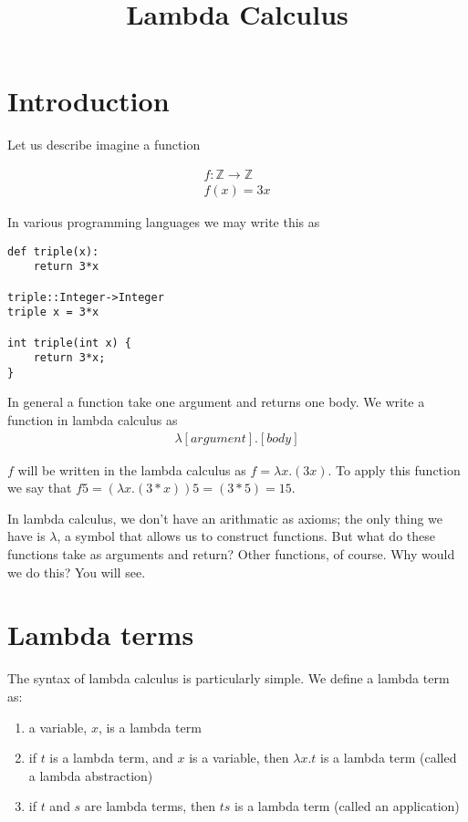 \documentclass{article}
\title{Lambda Calculus}
\date{}
\begin{document}
\maketitle

\section{Introduction}
Let us describe imagine a function 

\begin{align}
f:\mathbb{Z}\rightarrow\mathbb{Z}\\
f(x) = 3x
\end{align}

In various programming languages we may write this as

\begin{verbatim}
def triple(x):
    return 3*x
    
triple::Integer->Integer
triple x = 3*x

int triple(int x) {
    return 3*x;
}
\end{verbatim}

In general a function take one argument and returns one body. We write a function in lambda calculus as 
\begin{align}
\lambda[argument].[body]
\end{align}

$f$ will be written in the lambda calculus as $f = \lambda x.(3x)$. To apply this function we say that $f5 = (\lambda x.(3*x))5 = (3*5) = 15$.

In lambda calculus, we don't have an arithmatic as axioms; the only thing we have is $\lambda$, a symbol that allows us to construct functions. But what do these functions take as arguments and return? Other functions, of course. Why would we do this? You will see.

\section{Lambda terms}

The syntax of lambda calculus is particularly simple. We define a lambda term as:

\begin{enumerate}
\item{a variable, $x$, is a lambda term}
\item{if $t$ is a lambda term, and $x$ is a variable, then $\lambda x.t$ is a lambda term (called a lambda abstraction)}
\item{if $t$ and $s$ are lambda terms, then $ts$ is a lambda term (called an application)}
\end{enumerate}
\end{document}
